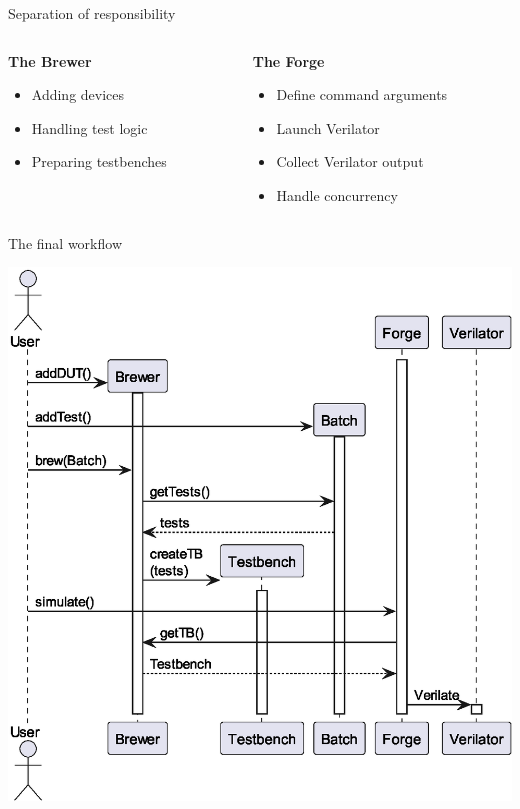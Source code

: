 \documentclass[aspectratio=169, handout]{beamer}
\begin{document}
\begin{frame}{Separation of responsibility}
    \begin{columns}[T]
        \begin{column}{.45\textwidth}
            \textbf{The Brewer}
            \begin{itemize}
                \item Adding devices
                \item Handling test logic
                \item Preparing testbenches
            \end{itemize}
        \end{column}
        \begin{column}{.45\textwidth}
            \textbf{The Forge}
            \begin{itemize}
                \item Define command arguments
                \item Launch Verilator
                \item Collect Verilator output
                \item Handle concurrency
            \end{itemize}
        \end{column}
    \end{columns}
\end{frame}
\begin{frame}{The final workflow}
    \begin{center}
        \includegraphics[height=.8\textheight]{out/plantuml/seq/sequenceDiag.eps}
    \end{center}
\end{frame}
\end{document}
